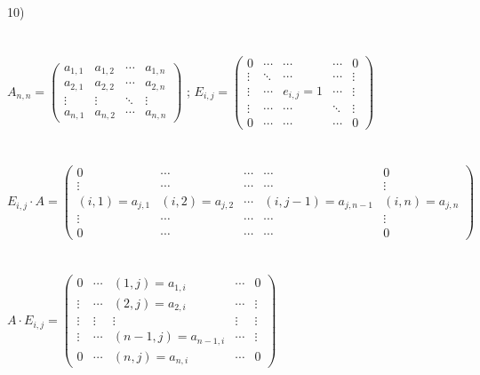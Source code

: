 \documentclass[12pt, a4paper]{article}
\begin{document}
	   \\\\\\
	   10) 
	   \\\\\\
	   \begin{math}
	   	A_{n,n} = 
	   	\left(
	   	\begin{array}{rrrr}
	   		a_{1, 1} & a_{1, 2} & \cdots & a_{1, n}\\
	   		a_{2, 1} & a_{2, 2} & \cdots & a_{2, n}\\
	   		\vdots & \vdots & \ddots & \vdots\\
	   		a_{n, 1} & a_{n, 2} & \cdots & a_{n, n}
	   	\end{array}
	   	\right )
	   \end{math}
	   ; 
	    \begin{math}
	   	E_{i,j} = 
	   	\left(
	   	\begin{array}{rrrrr}
	   		0 & \cdots & \cdots & \cdots &  0\\
	   		\vdots & \ddots & \cdots & \cdots & \vdots\\
	   		\vdots & \cdots & e_{i, j}  = 1& \cdots & \vdots\\
	   		\vdots & \cdots & \cdots & \ddots & \vdots\\
	   		0 & \cdots & \cdots& \cdots & 0
	   		
	   	\end{array}
	   	\right )
	   \end{math}
	   \\\\\\
	    \begin{math}
	   	E_{i,j} \cdot A =  
	   	\left(
	   \begin{array}{ccccc}
		   	0 & \cdots & \cdots & \cdots & 0\\
		   	\vdots & \cdots & \cdots & \cdots & \vdots \\
		   	(i, 1) = a_{j, 1} & (i, 2) = a_{j, 2} & \cdots & (i, j - 1) = a_{j, n - 1} & (i, n) = a_{j, n} \\
		   	\vdots & \cdots & \cdots & \cdots & \vdots\\
		   	0 & \cdots & \cdots & \cdots & 0
	   \end{array}
	   	\right )
	   \end{math}
	   \\\\\\
	   \begin{math}
	   	A \cdot E_{i, j} = 
	   	\left(
	   	\begin{array}{ccccc}
	   		0 & \cdots & (1, j) = a_{1, i} & \cdots & 0\\
	   		\vdots & \cdots & (2, j) = a_{2, i} & \cdots & \vdots \\
	   		\vdots & \vdots & \vdots & \vdots & \vdots \\
	   		\vdots & \cdots & (n - 1, j) = a_{n - 1, i} & \cdots & \vdots \\
	   		0 & \cdots & (n, j)  = a_{n, i} & \cdots & 0
	   	\end{array}
	   	\right )
	   \end{math}
	   
	   
\end{document}
